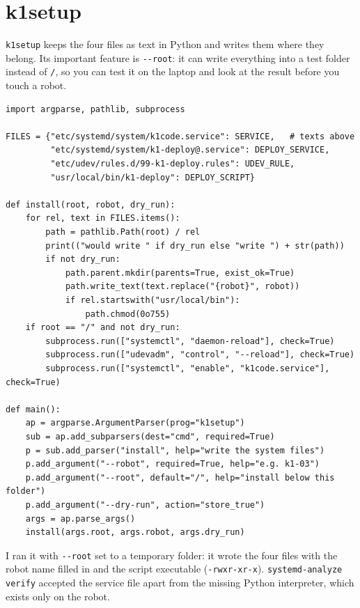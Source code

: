 \section*{k1setup}
\texttt{k1setup} keeps the four files as text in Python and writes them where they belong. Its important feature is \texttt{-{}-root}: it can write everything into a test folder instead of \texttt{/}, so you can test it on the laptop and look at the result before you touch a robot.
\begin{verbatim}
import argparse, pathlib, subprocess

FILES = {"etc/systemd/system/k1code.service": SERVICE,   # texts above
         "etc/systemd/system/k1-deploy@.service": DEPLOY_SERVICE,
         "etc/udev/rules.d/99-k1-deploy.rules": UDEV_RULE,
         "usr/local/bin/k1-deploy": DEPLOY_SCRIPT}

def install(root, robot, dry_run):
    for rel, text in FILES.items():
        path = pathlib.Path(root) / rel
        print(("would write " if dry_run else "write ") + str(path))
        if not dry_run:
            path.parent.mkdir(parents=True, exist_ok=True)
            path.write_text(text.replace("{robot}", robot))
            if rel.startswith("usr/local/bin"):
                path.chmod(0o755)
    if root == "/" and not dry_run:
        subprocess.run(["systemctl", "daemon-reload"], check=True)
        subprocess.run(["udevadm", "control", "--reload"], check=True)
        subprocess.run(["systemctl", "enable", "k1code.service"], check=True)

def main():
    ap = argparse.ArgumentParser(prog="k1setup")
    sub = ap.add_subparsers(dest="cmd", required=True)
    p = sub.add_parser("install", help="write the system files")
    p.add_argument("--robot", required=True, help="e.g. k1-03")
    p.add_argument("--root", default="/", help="install below this folder")
    p.add_argument("--dry-run", action="store_true")
    args = ap.parse_args()
    install(args.root, args.robot, args.dry_run)
\end{verbatim}
I ran it with \verb!--root! set to a temporary folder: it wrote the four files with the robot name filled in and the script executable (\texttt{-rwxr-xr-x}). \verb!systemd-analyze verify! accepted the service file apart from the missing Python interpreter, which exists only on the robot.

